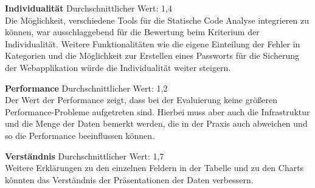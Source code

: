 \textbf{Individualität}
Durchschnittlicher Wert: 1,4\\
Die Möglichkeit, verschiedene Tools für die Statische Code Analyse integrieren zu können, war ausschlaggebend für die Bewertung beim Kriterium der Individualität. Weitere Funktionalitäten wie die eigene Einteilung der Fehler in Kategorien und die Möglichkeit zur Erstellen eines Passworts für die Sicherung der Webapplikation würde die Individualität weiter steigern.

\textbf{Performance}
Durchschnittlicher Wert: 1,2\\
Der Wert der Performance zeigt, dass bei der Evaluierung keine größeren Performance-Probleme aufgetreten sind. Hierbei muss aber auch die Infrastruktur und die Menge der Daten bemerkt werden, die in der Praxis auch abweichen und so die Performance beeinflussen können.

\textbf{Verständnis}
Durchschnittlicher Wert: 1,7\\
Weitere Erklärungen zu den einzelnen Feldern in der Tabelle und zu den Charts könnten das Verständnis der Präsentationen der Daten verbessern.